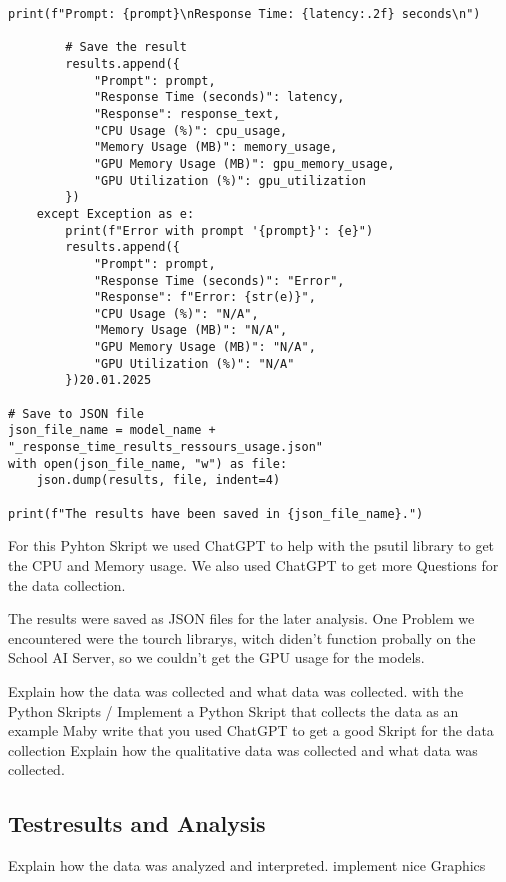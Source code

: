 \begin{lstlisting}[style=Python, caption={Python-quantitative-data-collection}, captionpos=b]
        print(f"Prompt: {prompt}\nResponse Time: {latency:.2f} seconds\n")

        # Save the result
        results.append({
            "Prompt": prompt,
            "Response Time (seconds)": latency,
            "Response": response_text,
            "CPU Usage (%)": cpu_usage,
            "Memory Usage (MB)": memory_usage,
            "GPU Memory Usage (MB)": gpu_memory_usage,
            "GPU Utilization (%)": gpu_utilization
        })
    except Exception as e:
        print(f"Error with prompt '{prompt}': {e}")
        results.append({
            "Prompt": prompt,
            "Response Time (seconds)": "Error",
            "Response": f"Error: {str(e)}",
            "CPU Usage (%)": "N/A",
            "Memory Usage (MB)": "N/A",
            "GPU Memory Usage (MB)": "N/A",
            "GPU Utilization (%)": "N/A"
        })20.01.2025

# Save to JSON file
json_file_name = model_name + "_response_time_results_ressours_usage.json"
with open(json_file_name, "w") as file:
    json.dump(results, file, indent=4)

print(f"The results have been saved in {json_file_name}.")

\end{lstlisting}

For this Pyhton Skript we used ChatGPT to help with the psutil library to get the CPU and Memory usage. 
We also used ChatGPT to get more Questions for the data collection. 

The results were saved as JSON files for the later analysis. One Problem we encountered were the tourch librarys, witch 
diden't function probally on the School AI Server, so we couldn't get the GPU usage for the models.


Explain how the data was collected and what data was collected.
with the Python Skripts / Implement a Python Skript that collects the data as an example 
Maby write that you used ChatGPT to get a good Skript for the data collection
Explain how the qualitative data was collected and what data was collected.

\subsection{Testresults and Analysis}

Explain how the data was analyzed and interpreted.
implement nice Graphics


